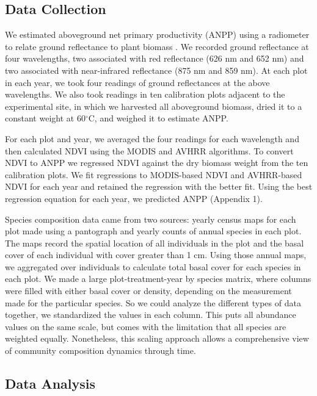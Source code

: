 \documentclass[fleqn,10pt]{wlpeerj} %
\begin{document}
\subsection{Data Collection}\label{data-collection}

We estimated aboveground net primary productivity (ANPP) using a
radiometer to relate ground reflectance to plant biomass \citep[see][
for a review]{Byrne2011}. We recorded ground reflectance at four
wavelengths, two associated with red reflectance (626 nm and 652 nm) and
two associated with near-infrared reflectance (875 nm and 859 nm). At
each plot in each year, we took four readings of ground reflectances at
the above wavelengths. We also took readings in ten calibration plots
adjacent to the experimental site, in which we harvested all aboveground
biomass, dried it to a constant weight at 60\(^{\circ}\)C, and weighed
it to estimate ANPP.

For each plot and year, we averaged the four readings for each
wavelength and then calculated NDVI using the MODIS and AVHRR
algorithms. To convert NDVI to ANPP we regressed NDVI against the dry
biomass weight from the ten calibration plots. We fit regressions to
MODIS-based NDVI and AVHRR-based NDVI for each year and retained the
regression with the better fit. Using the best regression equation for
each year, we predicted ANPP (Appendix 1).

Species composition data came from two sources: yearly census maps for
each plot made using a pantograph \citep{Hill1920} and yearly counts of
annual species in each plot. The maps record the spatial location of all
individuals in the plot and the basal cover of each individual with
cover greater than 1 cm. Using those annual maps, we aggregated over
individuals to calculate total basal cover for each species in each
plot. We made a large plot-treatment-year by species matrix, where
columns were filled with either basal cover or density, depending on the
measurement made for the particular species. So we could analyze the
different types of data together, we standardized the values in each
column. This puts all abundance values on the same scale, but comes with
the limitation that all species are weighted equally. Nonetheless, this
scaling approach allows a comprehensive view of community composition
dynamics through time.

\subsection{Data Analysis}\label{data-analysis}
\end{document}
